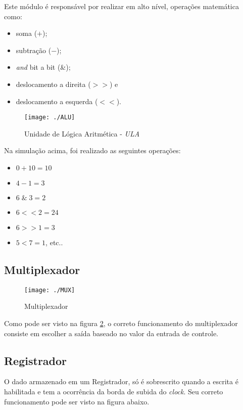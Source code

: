 \documentclass[12pt, a4paper]{article}
\begin{document}
	\par Este módulo é responsável por realizar em alto nível, operações matemática como:
	
	\begin{itemize}
		\item soma ($+$);
		\item subtração ($-$);
		\item \textit{and} bit a bit (\&);
		\item deslocamento a direita ($>>$) e
		\item deslocamento a esquerda ($<<$).
	\end{itemize}
	
	\begin{figure}[H]
		\centering
		\texttt{[image: ./ALU]}
		\caption{Unidade de Lógica Aritmética - \textit{ULA}}
		\label{fig: ULA}
	\end{figure}

	\par Na simulação acima, foi realizado as seguintes operações:
	
	\begin{itemize}
		\item $0 + 10 = 10$
		\item $4 - 1 = 3$
		\item $6\;\&\; 3 = 2$
		\item $6 << 2 = 24$
		\item $6 >> 1 = 3$
		\item $5 < 7 = 1$, etc..
	\end{itemize}

	\subsection{Multiplexador}

	\begin{figure}[H]
		\centering
		\texttt{[image: ./MUX]}
		\caption{Multiplexador}
		\label{fig: MUX}
	\end{figure}

	\par Como pode ser visto na figura \ref{fig: MUX}, o correto funcionamento do multiplexador consiste em escolher a saída baseado no valor da entrada de controle.

	\subsection{Registrador}
	
	\par O dado armazenado em um Registrador, só é sobrescrito quando a escrita é habilitada e tem a ocorrência da borda de subida do \textit{clock}. Seu correto funcionamento pode ser visto na figura abaixo.
\end{document}

